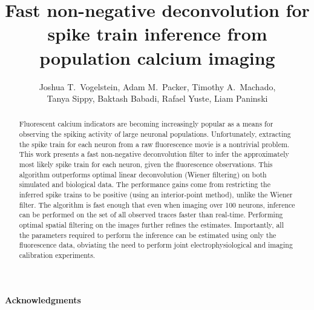  
\usepackage{multicol}
\usepackage{hyperref}
\usepackage{algorithmic}
\usepackage{algorithm}
\newcommand{\zzz}{z}
\newcommand{\az}{\argmax_{\bM \bC \geq \ve{0}}}
\newcommand{\anx}{\argmax_{n_t \in \mathbb{N}_0 \forall t}}
\newcommand{\foopsi}{fast }


\title{Fast non-negative deconvolution for spike train inference from population calcium imaging}

\author{Joshua T.~Vogelstein, Adam M.~Packer, Timothy A.~Machado, \\ Tanya Sippy, Baktash Babadi, Rafael Yuste, Liam Paninski}



\maketitle
\begin{abstract}
Fluorescent calcium indicators are becoming increasingly popular as a means for observing the spiking activity of large neuronal populations. Unfortunately, extracting the spike train for each neuron from a raw fluorescence movie is a nontrivial problem.  This work presents a fast non-negative deconvolution filter to infer the approximately most likely spike train for each neuron, given the fluorescence observations. This algorithm outperforms optimal linear deconvolution (Wiener filtering) on both simulated and biological data. The performance gains come from restricting the inferred spike trains to be positive (using an interior-point method), unlike the Wiener filter.  The algorithm is fast enough that even when imaging over 100 neurons, inference can be performed on the set of all observed traces faster than real-time.  Performing optimal spatial filtering on the images further refines the estimates.  Importantly, all the parameters required to perform the inference can be estimated using only the fluorescence data, obviating the need to perform joint electrophysiological and imaging calibration experiments.
\end{abstract}



\paragraph{Acknowledgments}

